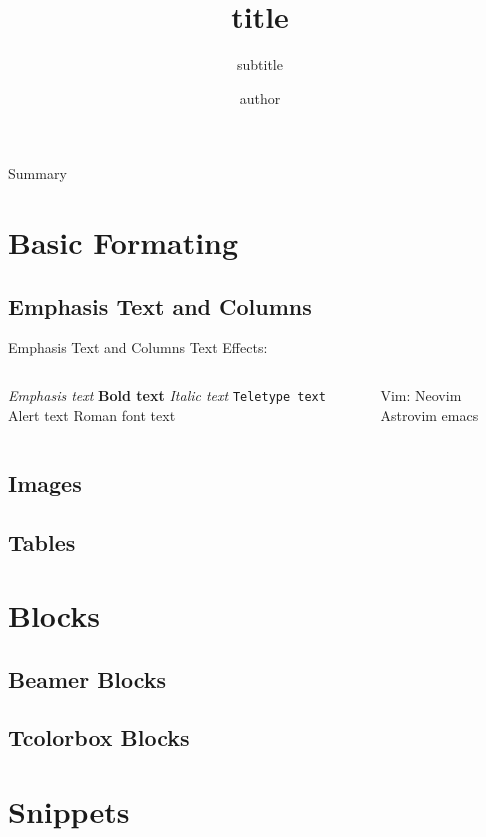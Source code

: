 \documentclass[gruvbox,Frankfurt,12pt]{darkbeamer}
\author{author}
\title{title}
\subtitle{subtitle}
\institute{My University}
\begin{document}
\begin{frame}{}
	\titlepage
\end{frame}

\begin{frame}{Summary}
	\tableofcontents
\end{frame}

\section{Basic Formating}
\subsection{Emphasis Text and Columns}
\begin{frame}{Emphasis Text and Columns}
	Text Effects:
	\begin{columns}[c]
		\begin{outline}
			\1 \emph{Emphasis text}
			\1 \textbf{Bold text}
			\1 \textit{Italic text}
			\1 \texttt{Teletype text}
			\1 \alert{Alert text}
			\1 \textrm{Roman font text}
		\end{outline}
		\column{.45\textwidth}
		\begin{outline}[enumerate]
			\1 Vim:
			\2 Neovim
			\2 Astrovim
			\1 emacs
		\end{outline}
	\end{columns}
\end{frame}
\subsection{Images}
\subsection{Tables}

\section{Blocks}
\subsection{Beamer Blocks}
\subsection{Tcolorbox Blocks}

\section{Snippets}
\end{document}
